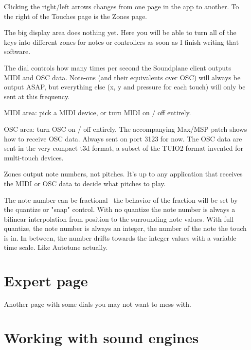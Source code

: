 Clicking the right/left arrows changes from one page in the app to another.  To the right of the Touches page is the Zones page.  

The big display area does nothing yet. Here you will be able to turn all of the keys into different zones for notes or controllers as soon as I finish writing that software. 

The  dial controls how many times per second the Soundplane client outputs MIDI and OSC data.  Note-ons (and their equivalents over OSC) will always be output ASAP, but everything else (x, y and pressure for each touch) will only be sent at this frequency. 

MIDI area: pick a MIDI device, or turn MIDI on / off entirely.

OSC area: turn OSC on / off entirely.  The accompanying Max/MSP patch shows how to receive OSC data.  Always sent on port 3123 for now.  The OSC data are sent in the very compact t3d format, a subset of the TUIO2 format invented for multi-touch devices.  

Zones output note numbers, not pitches.  It's up to any application that receives the MIDI or OSC data to decide what pitches to play. 

The note number can be fractional-- the behavior of the fraction will be set by the quantize or "snap" control.  With no quantize the note number is always a bilinear interpolation from position to the surrounding note values.  With full quantize, the note number is always an integer, the number of the note the touch is in.  In between, the number drifts towards the integer values with a variable time scale.  Like Autotune actually.



\section{Expert page}

Another page with some dials you may not want to mess with.  


\section{Working with sound engines}

